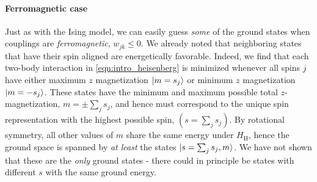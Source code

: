 \paragraph{Ferromagnetic case} Just as with the Ising model, we can easily guess \emph{some} of the ground states when couplings are \emph{ferromagnetic}, $w_{jk} \leq 0$. We already noted that neighboring states that have their spin aligned are energetically favorable. Indeed, we find that each two-body interaction in \cref{eqn:intro_heisenberg} is minimized whenever all spins $j$ have either maximum $z$ magnetization $\lvert m=s_j\rangle$ or minimum $z$ magnetization $\lvert m=-s_j\rangle$. These states have the minimum and maximum possible total $z$-magnetization, $m = \pm \sum_j s_j$, and hence must correspond to the unique spin representation with the highest possible spin, $(s= \sum_j s_j)$. By rotational symmetry, all other values of $m$ share the same energy under $H_\text{H}$, hence the ground space is spanned by \emph{at least} the states $\lvert s= \sum_j s_j, m \rangle$. We have not shown that these are the \emph{only} ground states - there could in principle be states with different $s$ with the same ground energy. %


